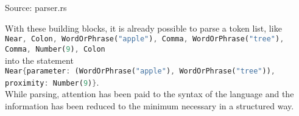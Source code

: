 \begin{codeenv}
    \label{code:parse-word}
    
    \centerline{Source: parser.rs}
\end{codeenv}
With these building blocks, it is already possible to parse a token list, like\\
\lstinline[language=Rust]$Near, Colon, WordOrPhrase("apple"), Comma, WordOrPhrase("tree"), Comma, Number(9), Colon$\\
into the statement\\
\lstinline[language=Rust]$Near{parameter: (WordOrPhrase("apple"), WordOrPhrase("tree")), proximity: Number(9)}$.\\
While parsing, attention has been paid to the syntax of the language and the information has been reduced to the minimum necessary in a structured way.
